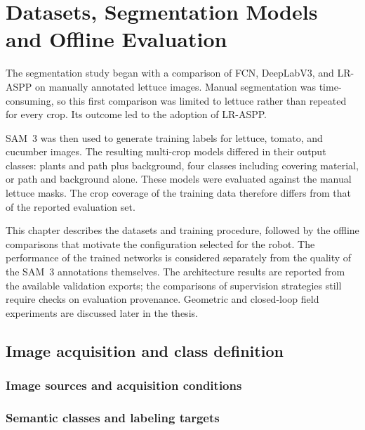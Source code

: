 \chapter{Datasets, Segmentation Models and Offline Evaluation}
\label{cap:dataset_modelli}

The segmentation study began with a comparison of FCN, DeepLabV3, and
LR-ASPP on manually annotated lettuce images. Manual segmentation was
time-consuming, so this first comparison was limited to lettuce rather
than repeated for every crop. Its outcome led to the adoption of LR-ASPP.

SAM~3 was then used to generate training labels for lettuce, tomato, and
cucumber images. The resulting multi-crop models differed in their output
classes: plants and path plus background, four classes including covering
material, or path and background alone. These models were evaluated
against the manual lettuce masks. The crop coverage of the training data
therefore differs from that of the reported evaluation set.

This chapter describes the datasets and training procedure, followed by
the offline comparisons that motivate the configuration selected for the
robot. The performance of the trained networks is considered separately
from the quality of the SAM~3 annotations themselves. The architecture results are reported from the available validation
exports; the comparisons of supervision strategies still require checks
on evaluation provenance. Geometric and closed-loop field experiments
are discussed later in the thesis.

\section{Image acquisition and class definition}
\label{sec:c3_acquisition_classes}

\subsection{Image sources and acquisition conditions}
\label{subsec:c3_image_acquisition}

\subsection{Semantic classes and labeling targets}
\label{subsec:c3_semantic_classes}

